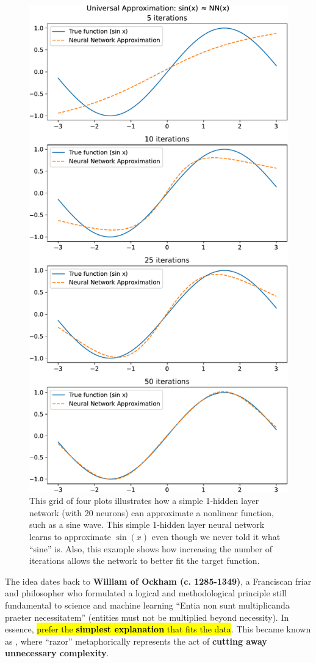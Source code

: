 \begin{figure}[!htp]
    \centering
    \includegraphics[width=.8\textwidth]{img/neural-networks-and-overfitting/universal-approximation-theorem.pdf}
    \caption{This grid of four plots illustrates how a simple 1-hidden layer network (with 20 neurons) can approximate a nonlinear function, such as a sine wave. This simple 1-hidden layer neural network learns to approximate $\sin(x)$ even though we never told it what ``sine'' is. Also, this example shows how increasing the number of iterations allows the network to better fit the target function.}
\end{figure}

\highspace
\begin{flushleft}
\end{flushleft}
The idea dates back to \textbf{William of Ockham (c. 1285-1349)}, a Franciscan friar and philosopher who formulated a logical and methodological principle still fundamental to science and machine learning ``Entia non sunt multiplicanda praeter necessitatem'' (entities must not be multiplied beyond necessity). In essence, \hl{prefer the \textbf{simplest explanation} that fits the data}. This became known as , where ``razor'' metaphorically represents the act of \textbf{cutting away unnecessary complexity}.

